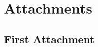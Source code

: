 \documentclass[12pt,a4paper]{report}
\let\openright=\clearpage
\begin{document}
\appendix
\chapter{Attachments}

\section{First Attachment}

\openright
\end{document}
